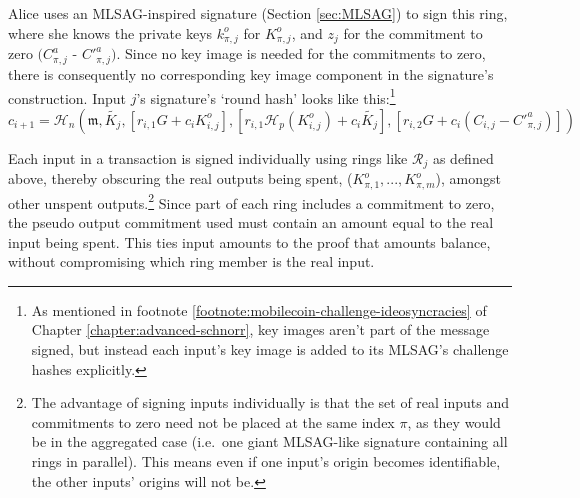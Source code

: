 Alice uses an MLSAG-inspired signature (Section \ref{sec:MLSAG}) to sign this ring, where she knows the private keys $k^o_{\pi,j}$ for $K^o_{\pi,j}$, and $z_j$ for the commitment to zero $(C^a_{\pi,j}$ - $C'^a_{\pi,j})$. Since no key image is needed for the commitments to zero, there is consequently no corresponding key image component in the signature’s construction. Input $j$'s signature's `round hash' looks like this:\footnote{As mentioned in footnote \ref{footnote:mobilecoin-challenge-ideosyncracies} of Chapter \ref{chapter:advanced-schnorr}, key images aren't part of the message signed, but instead each input's key image is added to its MLSAG's challenge hashes explicitly.}\vspace{.155cm}
\[c_{i+1} = \mathcal{H}_n(\mathfrak{m}, \tilde{K_j}, [r_{i,1} G + c_i K^o_{i,j}], [r_{i,1} \mathcal{H}_p(K^o_{i,j}) + c_i \tilde{K_j}], [r_{i,2} G + c_i (C_{i, j} - C'^a_{\pi, j})])\]

Each input in a transaction is signed individually using rings like \(\mathcal{R}_j\) as defined above, thereby obscuring the real outputs being spent, ($K^o_{\pi,1},...,K^o_{\pi,m}$), amongst other unspent outputs.\footnote{The advantage of signing inputs individually is that the set of real inputs and commitments to zero need not be placed at the same index $\pi$, as they would be in the aggregated case (i.e.\ one giant MLSAG-like signature containing all rings in parallel). This means even if one input's origin becomes identifiable, the other inputs' origins will not be.} Since part of each ring includes a commitment to zero, the pseudo output commitment used must contain an amount equal to the real input being spent. This ties input amounts to the proof that amounts balance, without compromising which ring member is the real input.\\

